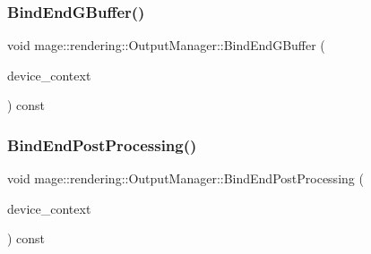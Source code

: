 \hypertarget{classmage_1_1rendering_1_1_output_manager_a380113a2b1c9049cfd2367a6344683b7}{}\label{classmage_1_1rendering_1_1_output_manager_a380113a2b1c9049cfd2367a6344683b7} 
\subsubsection{\texorpdfstring{Bind\+End\+G\+Buffer()}{BindEndGBuffer()}}
{\footnotesize\ttfamily void mage\+::rendering\+::\+Output\+Manager\+::\+Bind\+End\+G\+Buffer (\begin{DoxyParamCaption}\item[{I\+D3\+D11\+Device\+Context \&}]{device\+\_\+context }\end{DoxyParamCaption}) const\hspace{0.3cm}{\ttfamily [noexcept]}}

\hypertarget{classmage_1_1rendering_1_1_output_manager_a47e4a5dfc0bca82c49ebde85e01d55cc}{}\label{classmage_1_1rendering_1_1_output_manager_a47e4a5dfc0bca82c49ebde85e01d55cc} 
\subsubsection{\texorpdfstring{Bind\+End\+Post\+Processing()}{BindEndPostProcessing()}}
{\footnotesize\ttfamily void mage\+::rendering\+::\+Output\+Manager\+::\+Bind\+End\+Post\+Processing (\begin{DoxyParamCaption}\item[{I\+D3\+D11\+Device\+Context \&}]{device\+\_\+context }\end{DoxyParamCaption}) const\hspace{0.3cm}{\ttfamily [noexcept]}}

\hypertarget{classmage_1_1rendering_1_1_output_manager_a548e6003d34916b174f74f6f1b5e85a2}{}\label{classmage_1_1rendering_1_1_output_manager_a548e6003d34916b174f74f6f1b5e85a2} 
